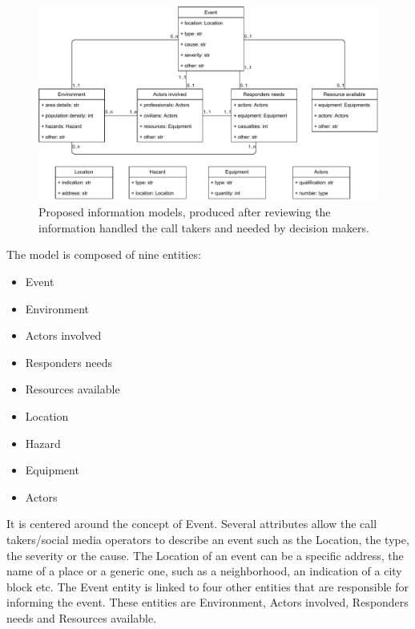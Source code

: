 \begin{figure}
    \centering
    \includegraphics[width=\textwidth]{figures/chap-3/information-needs.pdf}
    \caption{Proposed information models, produced after reviewing the information handled the call takers and needed by decision makers.}
    \label{information:information-models}
\end{figure}

The model is composed of nine entities:
\begin{itemize}
    \item Event
    \item Environment
    \item Actors involved
    \item Responders needs
    \item Resources available
    \item Location
    \item Hazard
    \item Equipment
    \item Actors
\end{itemize}

It is centered around the concept of Event.
Several attributes allow the call takers/social media operators to describe an event such as
the Location, the type, the severity or the cause.
The Location of an event can be a specific address, the name of a place or a generic one,
such as a neighborhood, an indication of a city block etc.
The Event entity is linked to four other entities that are responsible for informing the event.
These entities are Environment, Actors involved, Responders needs and Resources available.

